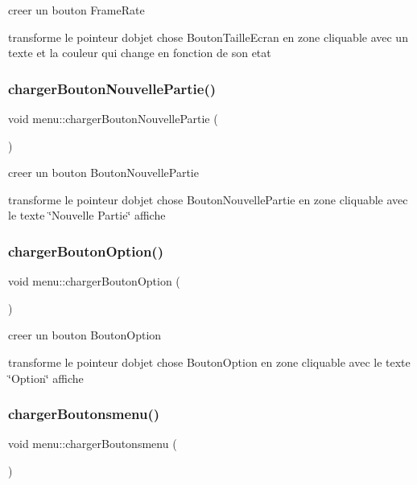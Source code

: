 creer un bouton Frame\+Rate 

transforme le pointeur d\textquotesingle{}objet chose Bouton\+Taille\+Ecran en zone cliquable avec un texte et la couleur qui change en fonction de son etat \mbox{\label{classmenu_ae677fc7873a22b0ed1de9f1f53e85d37}} 
\subsubsection{\texorpdfstring{charger\+Bouton\+Nouvelle\+Partie()}{chargerBoutonNouvellePartie()}}
{\footnotesize\ttfamily void menu\+::charger\+Bouton\+Nouvelle\+Partie (\begin{DoxyParamCaption}{ }\end{DoxyParamCaption})}



creer un bouton Bouton\+Nouvelle\+Partie 

transforme le pointeur d\textquotesingle{}objet chose Bouton\+Nouvelle\+Partie en zone cliquable avec le texte \char`\"{}\+Nouvelle Partie\char`\"{} affiche \mbox{\label{classmenu_a7b9fc371fe13a2bf37e876d7635299c9}} 
\subsubsection{\texorpdfstring{charger\+Bouton\+Option()}{chargerBoutonOption()}}
{\footnotesize\ttfamily void menu\+::charger\+Bouton\+Option (\begin{DoxyParamCaption}{ }\end{DoxyParamCaption})}



creer un bouton Bouton\+Option 

transforme le pointeur d\textquotesingle{}objet chose Bouton\+Option en zone cliquable avec le texte \char`\"{}\+Option\char`\"{} affiche \mbox{\label{classmenu_acf8e92d81eea07dc6b5dc023469a90ff}} 
\subsubsection{\texorpdfstring{charger\+Boutonsmenu()}{chargerBoutonsmenu()}}
{\footnotesize\ttfamily void menu\+::charger\+Boutonsmenu (\begin{DoxyParamCaption}{ }\end{DoxyParamCaption})}



